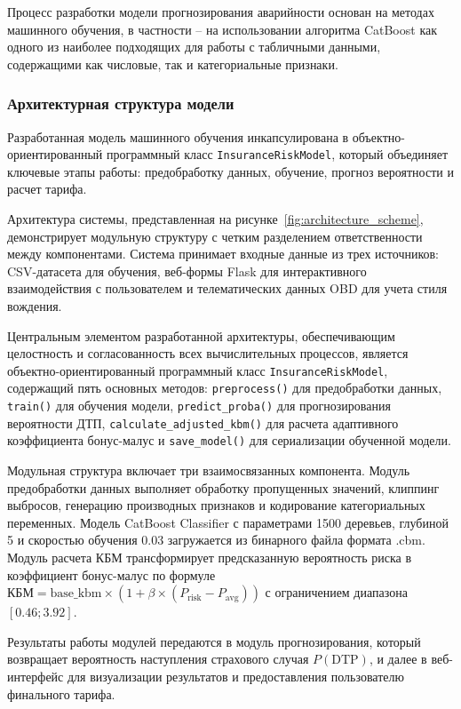 Процесс разработки модели прогнозирования аварийности основан на методах машинного обучения, в частности – на использовании алгоритма CatBoost как одного из наиболее подходящих для работы с табличными данными, содержащими как числовые, так и категориальные признаки.

\subsubsection{Архитектурная структура модели}

Разработанная модель машинного обучения инкапсулирована в объектно-ориентированный программный класс \texttt{InsuranceRiskModel}, который объединяет ключевые этапы работы: предобработку данных, обучение, прогноз вероятности и расчет тарифа.

Архитектура системы, представленная на рисунке~\ref{fig:architecture_scheme}, демонстрирует модульную структуру с четким разделением ответственности между компонентами. Система принимает входные данные из трех источников: CSV-датасета для обучения, веб-формы Flask для интерактивного взаимодействия с пользователем и телематических данных OBD для учета стиля вождения.

Центральным элементом разработанной архитектуры, обеспечивающим целостность и согласованность всех вычислительных процессов, является объектно-ориентированный программный класс \texttt{InsuranceRiskModel}, содержащий пять основных методов: \texttt{preprocess()} для предобработки данных, \texttt{train()} для обучения модели, \texttt{predict\_proba()} для прогнозирования вероятности ДТП, \texttt{calculate\_adjusted\_kbm()} для расчета адаптивного коэффициента бонус-малус и \texttt{save\_model()} для сериализации обученной модели.

Модульная структура включает три взаимосвязанных компонента. Модуль предобработки данных выполняет обработку пропущенных значений, клиппинг выбросов, генерацию производных признаков и кодирование категориальных переменных. Модель CatBoost Classifier с параметрами 1500 деревьев, глубиной 5 и скоростью обучения 0.03 загружается из бинарного файла формата .cbm. Модуль расчета КБМ трансформирует предсказанную вероятность риска в коэффициент бонус-малус по формуле $\text{КБМ} = \text{base\_kbm} \times (1 + \beta \times (P_{\text{risk}} - P_{\text{avg}}))$ с ограничением диапазона $[0.46; 3.92]$.

Результаты работы модулей передаются в модуль прогнозирования, который возвращает вероятность наступления страхового случая $P(\text{DTP})$, и далее в веб-интерфейс для визуализации результатов и предоставления пользователю финального тарифа.

